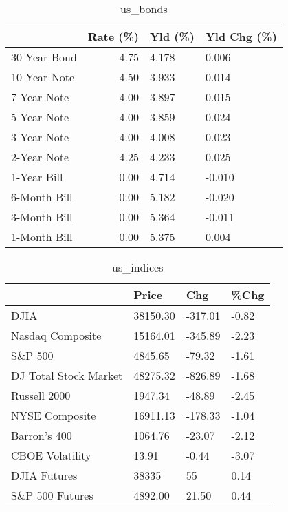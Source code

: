 \documentclass{article}%
\begin{document}
%


\begin{table}[htbp]%
\caption{us\_bonds}%
\centering%
\begin{adjustbox}{width=1\textwidth}%
\begin{tabular}{lrll}
\toprule
             &  Rate (\%) & Yld (\%) & Yld Chg (\%) \\
\midrule
30-Year Bond &      4.75 &   4.178 &       0.006 \\
10-Year Note &      4.50 &   3.933 &       0.014 \\
 7-Year Note &      4.00 &   3.897 &       0.015 \\
 5-Year Note &      4.00 &   3.859 &       0.024 \\
 3-Year Note &      4.00 &   4.008 &       0.023 \\
 2-Year Note &      4.25 &   4.233 &       0.025 \\
 1-Year Bill &      0.00 &   4.714 &      -0.010 \\
6-Month Bill &      0.00 &   5.182 &      -0.020 \\
3-Month Bill &      0.00 &   5.364 &      -0.011 \\
1-Month Bill &      0.00 &   5.375 &       0.004 \\
\bottomrule
\end{tabular}
%
\end{adjustbox}%
\end{table}

%


\begin{table}[htbp]%
\caption{us\_indices}%
\centering%
\begin{adjustbox}{width=1\textwidth}%
\begin{tabular}{llll}
\toprule
                      &    Price &     Chg &  \%Chg \\
\midrule
                 DJIA & 38150.30 & -317.01 & -0.82 \\
     Nasdaq Composite & 15164.01 & -345.89 & -2.23 \\
              S\&P 500 &  4845.65 &  -79.32 & -1.61 \\
DJ Total Stock Market & 48275.32 & -826.89 & -1.68 \\
         Russell 2000 &  1947.34 &  -48.89 & -2.45 \\
       NYSE Composite & 16911.13 & -178.33 & -1.04 \\
         Barron's 400 &  1064.76 &  -23.07 & -2.12 \\
      CBOE Volatility &    13.91 &   -0.44 & -3.07 \\
         DJIA Futures &    38335 &      55 &  0.14 \\
      S\&P 500 Futures &  4892.00 &   21.50 &  0.44 \\
\bottomrule
\end{tabular}
%
\end{adjustbox}%
\end{table}
\end{document}
